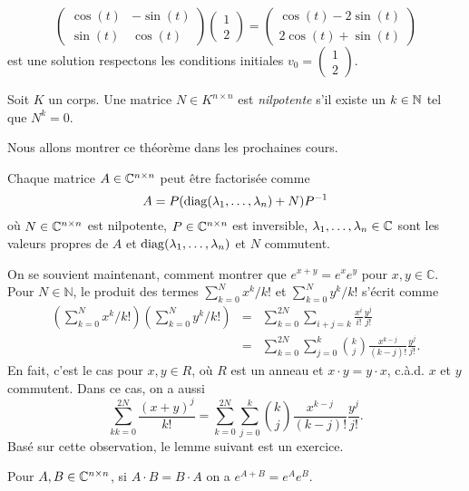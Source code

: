 \begin{example}
\begin{displaymath}
\begin{pmatrix}
    \cos(t)&-\sin(t)\\
    \sin(t)&\cos(t)
  \end{pmatrix} \begin{pmatrix}
    1\\
    2
\end{pmatrix}   =  \begin{pmatrix}
    \cos(t)-2\sin(t)\\
    2\cos(t)+\sin(t)
\end{pmatrix} 
\end{displaymath}
est une solution respectons les conditions initiales  $v_0 = 
\begin{pmatrix}
    1\\
    2
\end{pmatrix} $. 
\end{example}






\begin{definition}
  \label{def:29}Soit $K$ un corps. 
  Une matrice $N ∈ K^{n ×n}$ est \emph{nilpotente} s'il existe un $k \in \mathbb{N}$ tel que $N^k = 0$. 
\end{definition}

Nous allons montrer ce théorème dans les prochaines cours.  
\begin{theorem}
  \label{thr:32}
  Chaque matrice $A \in \mathbb{C}^{n \times n}$ peut être factorisée comme 
  \begin{displaymath}
    A = P ( \operatorname{diag}(\lambda_1,\dots,\lambda_n) + N) P^{-1}
  \end{displaymath}
où $N \in \mathbb{C}^{n \times n}$ est nilpotente, $P \in \mathbb{C}^{n \times n}$ est inversible,  $\lambda_1,\dots,\lambda_n \in \mathbb{C}$ sont les valeurs propres de $A$ et $\operatorname{diag}(\lambda_1,\dots,\lambda_n)$ et $N$ commutent. 
\end{theorem}
%
On se souvient maintenant, comment montrer que $e^{x+y}  = e^xe^y$ pour $x,y∈ ℂ$.  Pour $N ∈ ℕ$, le produit des termes
$∑_{k=0}^N x^k / k! $ et $∑_{k=0}^N y^k / k! $ s'écrit comme 
\begin{eqnarray}
  \left(∑_{k=0}^N x^k / k! \right) \left(∑_{k=0}^N y^k / k! \right) & = & \displaystyle  ∑_{k=0}^{2N}  ∑_{i+j = k} \frac{x^i}{  i!} \frac{y^j}{ j!} \\
  & = &  \displaystyle ∑_{k=0}^{2N}  ∑_{j = 0}^k \binom{k}{j} \frac{x^{k-j} }{(k-j)!} \frac{y^{j} }{j!}.   
\end{eqnarray}
En fait, c'est le cas pour $x,y ∈ R$, où $R$ est un anneau et $x ⋅ y  = y ⋅x$, c.à.d. $x$ et $y$ commutent.  Dans ce cas, on a aussi
\begin{displaymath}
  \displaystyle  ∑_{kk=0}^{2N} \frac{(x+y)^j}{k!} =  \displaystyle  ∑_{k=0}^{2N}  ∑_{j = 0}^k \binom{k}{j} \frac{x^{k-j} }{(k-j)!} \frac{y^{j} }{j!}.   
\end{displaymath}
%
Basé sur cette observation, le lemme suivant est un exercice. 
\begin{lemma}
  \label{lem:18}
  Pour $A,B \in \mathbb{C}^{n \times n}$, si $A\cdot B = B \cdot A$ on a $e^{A+B} = e^A e^B$. 
\end{lemma}



